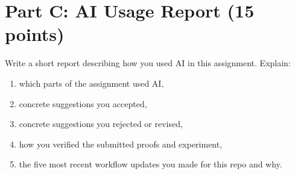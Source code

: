 \documentclass{article}
\begin{document}
\section{Part C: AI Usage Report (15 points)}

Write a short report describing how you used AI in this assignment. Explain:
\begin{enumerate}
\item which parts of the assignment used AI,
\item concrete suggestions you accepted,
\item concrete suggestions you rejected or revised,
\item how you verified the submitted proofs and experiment,
\item the five most recent workflow updates you made for this repo and why.
\end{enumerate}
\end{document}
